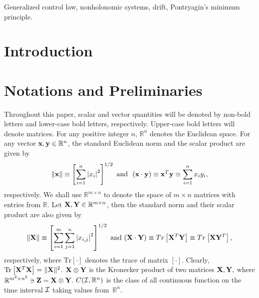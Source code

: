 \documentclass[
12pt,draftcls,onecolumn%
]{IEEEtran}
\begin{document}
\begin{IEEEkeywords}
Generalized control law, nonholonomic systems, drift, Pontryagin's minimum principle.
\end{IEEEkeywords}
\IEEEpeerreviewmaketitle

\section{Introduction}

\section{Notations and Preliminaries}\label{sec:notations}
Throughout this paper, scalar and vector quantities will be denoted by non-bold letters and lower-case bold letters, respectively. Upper-case bold letters will denote matrices. For any positive integer $n$, $\mathbb{R}^n$ denotes the Euclidean space. For any vector ${\bf x,y}\in\mathbb{R}^n$, the standard Euclidean norm and the scalar product are given by
\begin{equation*}
\|{\bf x}\| \equiv  \left[\sum_{i=1}^n \left |x_i\right |^2\right]^{1/2}~\hbox{and}~~ {\bf (x\cdot y)}\equiv{\bf x}^T{\bf y}\equiv\sum_{i=1}^n x_i y_i, 
\end{equation*}
respectively. We shall use $\mathbb{R}^{m\times n}$ to denote the space of $m\times n$ matrices with entries from $\mathbb{R}$.  Let ${\bf X,Y}\in\mathbb{R}^{m\times n}$, then the standard norm and their scalar product are also given by 
\begin{equation*}
\begin{split}
\|{\bf X}\|\equiv\left[\sum_{i=1}^m \sum_{j=1}^n\left |x_{i,j}\right |^2\right]^{1/2}~\text{and}~{\bf (X\cdot Y)}\equiv Tr\left[{\bf X}^T{\bf Y}\right]\equiv Tr\left[{\bf X}{\bf Y}^T\right],
\end{split}
\end{equation*}
respectively, where $\mathrm{Tr}\left[\cdot\right]$ denotes the trace of matrix $\left[\cdot\right]$. Clearly, $\mathrm{Tr}\left[{\bf X}^T{\bf X}\right]=\|{\bf X}\|^2$. ${\bf X}\otimes {\bf Y}$ is the Kronecker product of two matrices ${\bf X,Y},$ where $\mathbb{R}^{m^2\times n^2}\ni {\bf Z} = {\bf X}\otimes {\bf Y}.$ $C({\cal I}, \mathbb{R}^n)$ is the class of all continuous function on the time interval ${\cal I}$ taking values from~$\mathbb{R}^n.$
\end{document}
